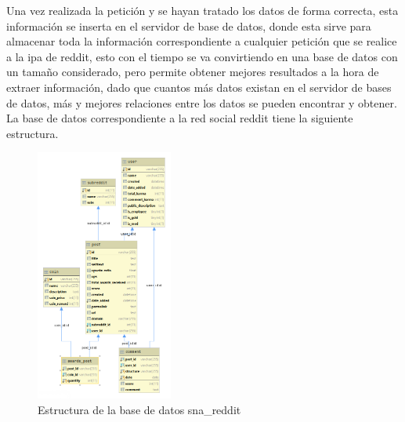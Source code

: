 \documentclass[../../main.tex]{subfiles}
\begin{document}
Una vez realizada la petición y se hayan tratado los datos de forma correcta, esta información se inserta en el servidor de base de datos, donde esta sirve para almacenar toda la información correspondiente a cualquier petición que se realice a la \gls{ipa} de \Gls{reddit}, esto con el tiempo se va convirtiendo en una base de datos con un tamaño considerado, pero permite obtener mejores resultados a la hora de extraer información, dado que cuantos más datos existan en el servidor de bases de datos, más y mejores relaciones entre los datos se pueden encontrar y obtener.  \\

La base de datos correspondiente a la red social \Gls{reddit} tiene la siguiente estructura.\\

\begin{figure}[H]
\centering
\includegraphics[width=0.4\textwidth]{images/info/sna_reddit.png}
\caption{Estructura de la base de datos sna\_reddit}
\end{figure}
\end{document}
